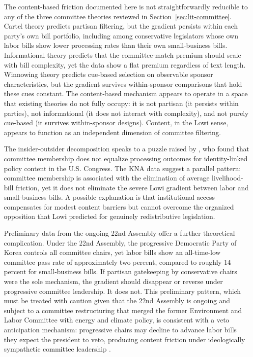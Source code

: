 \documentclass[11pt]{article}
\begin{document}
The content-based friction documented here is not straightforwardly reducible to any of the three committee theories reviewed in Section~\ref{sec:lit-committee}. Cartel theory \citep{cox2005} predicts partisan filtering, but the gradient persists within each party's own bill portfolio, including among conservative legislators whose own labor bills show lower processing rates than their own small-business bills. Informational theory \citep{krehbiel1991} predicts that the committee-match premium should scale with bill complexity, yet the data show a flat premium regardless of text length. Winnowing theory \citep{krutz2005} predicts cue-based selection on observable sponsor characteristics, but the gradient survives within-sponsor comparisons that hold these cues constant. The content-based mechanism appears to operate in a space that existing theories do not fully occupy: it is not partisan (it persists within parties), not informational (it does not interact with complexity), and not purely cue-based (it survives within-sponsor designs). Content, in the Lowi sense, appears to function as an independent dimension of committee filtering.

The insider-outsider decomposition speaks to a puzzle raised by \citet{peay2020}, who found that committee membership does not equalize processing outcomes for identity-linked policy content in the U.S. Congress. The KNA data suggest a parallel pattern: committee membership is associated with the elimination of average livelihood-bill friction, yet it does not eliminate the severe Lowi gradient between labor and small-business bills. A possible explanation is that institutional access compensates for modest content barriers but cannot overcome the organized opposition that Lowi predicted for genuinely redistributive legislation.

Preliminary data from the ongoing 22nd Assembly offer a further theoretical complication. Under the 22nd Assembly, the progressive Democratic Party of Korea controls all committee chairs, yet labor bills show an all-time-low committee pass rate of approximately two percent, compared to roughly 14 percent for small-business bills. If partisan gatekeeping by conservative chairs were the sole mechanism, the gradient should disappear or reverse under progressive committee leadership. It does not. This preliminary pattern, which must be treated with caution given that the 22nd Assembly is ongoing and subject to a committee restructuring that merged the former Environment and Labor Committee with energy and climate policy, is consistent with a veto anticipation mechanism: progressive chairs may decline to advance labor bills they expect the president to veto, producing content friction under ideologically sympathetic committee leadership \citep{cameron2000}.
\end{document}
